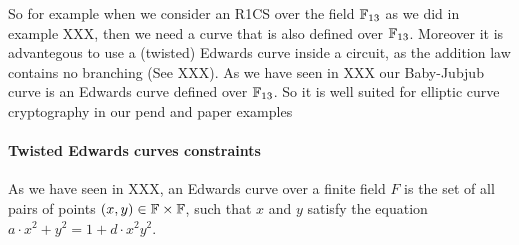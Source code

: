 
\begin{example}
So for example when we consider an R1CS over the field $\mathbb{F}_{13}$ as we did in example XXX, then we need a curve that is also defined over $\mathbb{F}_{13}$. Moreover it is advantegous to use a (twisted) Edwards curve inside a circuit, as the addition law contains no branching (See XXX). As we have seen in XXX our Baby-Jubjub curve is an Edwards curve defined over $\mathbb{F}_{13}$. So it is well suited for elliptic curve cryptography in our pend and paper examples
\end{example}

\paragraph{Twisted Edwards curves constraints} As we have seen in XXX, an Edwards curve over a finite field $F$ is the set of all pairs of points $(x,y)\in \mathbb{F}\times \mathbb{F}$, such that $x$ and $y$ satisfy the equation $a\cdot x^2+y^2= 1+d\cdot x^2y^2$. 

